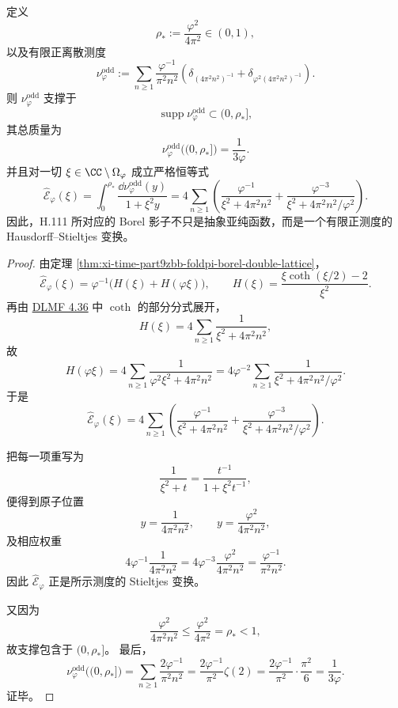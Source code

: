 \begin{theorem}\label{thm:xi-time-part9zbc-foldpi-borel-finite-positive-measure}
定义
\[
\rho_\ast:=\frac{\varphi^2}{4\pi^2}\in(0,1),
\]
以及有限正离散测度
\[
\nu_{\varphi}^{\mathrm{odd}}
:=
\sum_{n\ge 1}
\frac{\varphi^{-1}}{\pi^2n^2}
\left(
\delta_{(4\pi^2n^2)^{-1}}
+\delta_{\varphi^2(4\pi^2n^2)^{-1}}
\right).
\]
则 \(\nu_{\varphi}^{\mathrm{odd}}\) 支撑于
\[
\operatorname{supp}\nu_{\varphi}^{\mathrm{odd}}
\subset (0,\rho_\ast],
\]
其总质量为
\[
\nu_{\varphi}^{\mathrm{odd}}\bigl((0,\rho_\ast]\bigr)=\frac{1}{3\varphi}.
\]
并且对一切 \(\xi\in\CC\setminus \Omega_\varphi\) 成立严格恒等式
\[
\widehat{\mathcal E}_\varphi(\xi)
=
\int_{0}^{\rho_\ast}\frac{\dd\nu_{\varphi}^{\mathrm{odd}}(y)}{1+\xi^2 y}
=
4\sum_{n\ge 1}
\left(
\frac{\varphi^{-1}}{\xi^2+4\pi^2n^2}
+\frac{\varphi^{-3}}{\xi^2+4\pi^2n^2/\varphi^2}
\right).
\]
因此，H.111 所对应的 Borel 影子不只是抽象亚纯函数，而是一个有限正测度的 Hausdorff--Stieltjes 变换。
\end{theorem}
\begin{proof}
由定理 \ref{thm:xi-time-part9zbb-foldpi-borel-double-lattice}，
\[
\widehat{\mathcal E}_\varphi(\xi)=\varphi^{-1}\bigl(H(\xi)+H(\varphi\xi)\bigr),
\qquad
H(\xi)=\frac{\xi\coth(\xi/2)-2}{\xi^2}.
\]
再由 \href{https://dlmf.nist.gov/4.36}{DLMF 4.36} 中 \(\coth\) 的部分分式展开，
\[
H(\xi)=4\sum_{n\ge 1}\frac{1}{\xi^2+4\pi^2n^2},
\]
故
\[
H(\varphi\xi)
=
4\sum_{n\ge 1}\frac{1}{\varphi^2\xi^2+4\pi^2n^2}
=
4\varphi^{-2}\sum_{n\ge 1}\frac{1}{\xi^2+4\pi^2n^2/\varphi^2}.
\]
于是
\[
\widehat{\mathcal E}_\varphi(\xi)
=
4\sum_{n\ge 1}
\left(
\frac{\varphi^{-1}}{\xi^2+4\pi^2n^2}
+\frac{\varphi^{-3}}{\xi^2+4\pi^2n^2/\varphi^2}
\right).
\]

把每一项重写为
\[
\frac{1}{\xi^2+t}=\frac{t^{-1}}{1+\xi^2t^{-1}},
\]
便得到原子位置
\[
y=\frac{1}{4\pi^2n^2},
\qquad
y=\frac{\varphi^2}{4\pi^2n^2},
\]
及相应权重
\[
4\varphi^{-1}\frac{1}{4\pi^2n^2}
=
4\varphi^{-3}\frac{\varphi^2}{4\pi^2n^2}
=
\frac{\varphi^{-1}}{\pi^2n^2}.
\]
因此 \(\widehat{\mathcal E}_\varphi\) 正是所示测度的 Stieltjes 变换。

又因为
\[
\frac{\varphi^2}{4\pi^2n^2}\le \frac{\varphi^2}{4\pi^2}=\rho_\ast<1,
\]
故支撑包含于 \((0,\rho_\ast]\)。
最后，
\[
\nu_{\varphi}^{\mathrm{odd}}\bigl((0,\rho_\ast]\bigr)
=
\sum_{n\ge 1}\frac{2\varphi^{-1}}{\pi^2n^2}
=
\frac{2\varphi^{-1}}{\pi^2}\zeta(2)
=
\frac{2\varphi^{-1}}{\pi^2}\cdot\frac{\pi^2}{6}
=
\frac{1}{3\varphi}.
\]
证毕。
\end{proof}

